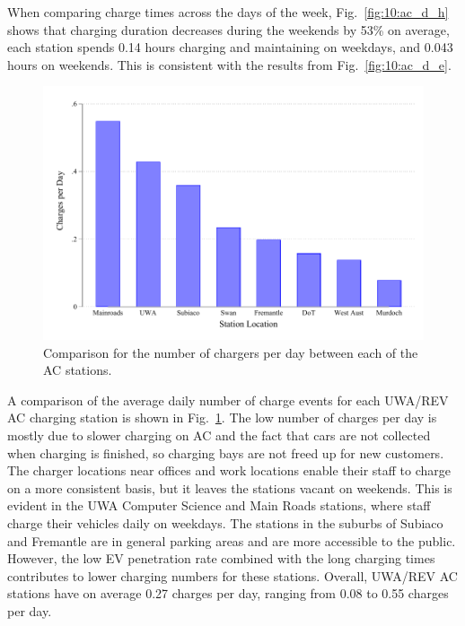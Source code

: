 When comparing charge times across the days of the week, Fig.~\ref{fig:10:ac_d_h} shows that charging duration decreases during the weekends by 53\% on average, each station spends 0.14 hours charging and maintaining on weekdays, and 0.043 hours on weekends. This is consistent with the results from Fig.~\ref{fig:10:ac_d_e}.

\begin{figure}[H]
	\centering
	\includegraphics[width=0.8\linewidth]{ac_p_c}
	\caption[Number of chargers per day between each AC station]{Comparison for the number of chargers per day between each of the AC stations.}
	\label{fig:10:ac_p_c}
\end{figure}

A comparison of the average daily number of charge events for each UWA/REV AC charging station is shown in Fig.~\ref{fig:10:ac_p_c}. The low number of charges per day is mostly due to slower charging on AC and the fact that cars are not collected when charging is finished, so charging bays are not freed up for new customers. The charger locations near offices and work locations enable their staff to charge on a more consistent basis, but it leaves the stations vacant on weekends. This is evident in the UWA Computer Science and Main Roads stations, where staff charge their vehicles daily on weekdays. The stations in the suburbs of Subiaco and Fremantle are in general parking areas and are more accessible to the public. However, the low EV penetration rate combined with the long charging times contributes to lower charging numbers for these stations. Overall, UWA/REV AC stations have on average 0.27 charges per day, ranging from 0.08 to 0.55 charges per day.

